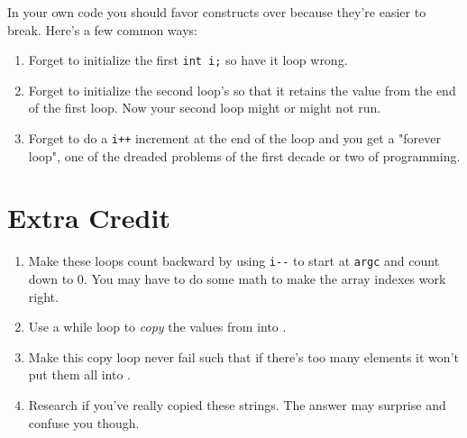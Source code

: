 In your own code you should favor  constructs over
 because they're easier to break.  Here's a few
common ways:

\begin{enumerate}
\item Forget to initialize the first \verb|int i;| so have it 
    loop wrong.
\item Forget to initialize the second loop's  so that it
    retains the value from the end of the first loop.  Now your 
    second loop might or might not run.
\item Forget to do a \verb|i++| increment at the end of the loop
    and you get a "forever loop", one of the dreaded problems
    of the first decade or two of programming.
\end{enumerate}

\section{Extra Credit}

\begin{enumerate}
\item Make these loops count backward by using \verb|i--| to start
    at \verb|argc| and count down to 0.  You may have to do some
    math to make the array indexes work right.
\item Use a while loop to \emph{copy} the values from 
    into .
\item Make this copy loop never fail such that if there's too many
     elements it won't put them all into .
\item Research if you've really copied these strings.  The answer may
    surprise and confuse you though.
\end{enumerate}


